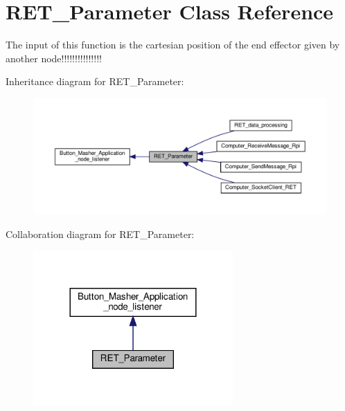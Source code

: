 \hypertarget{classRET__Parameter_1_1RET__Parameter}{}\section{R\+E\+T\+\_\+\+Parameter Class Reference}
\label{classRET__Parameter_1_1RET__Parameter}


The input of this function is the cartesian position of the end effector given by another node!!!!!!!!!!!!!!!  




Inheritance diagram for R\+E\+T\+\_\+\+Parameter\+:
\nopagebreak
\begin{figure}[H]
\begin{center}
\leavevmode
\includegraphics[width=350pt]{classRET__Parameter_1_1RET__Parameter__inherit__graph}
\end{center}
\end{figure}


Collaboration diagram for R\+E\+T\+\_\+\+Parameter\+:
\nopagebreak
\begin{figure}[H]
\begin{center}
\leavevmode
\includegraphics[width=216pt]{classRET__Parameter_1_1RET__Parameter__coll__graph}
\end{center}
\end{figure}
